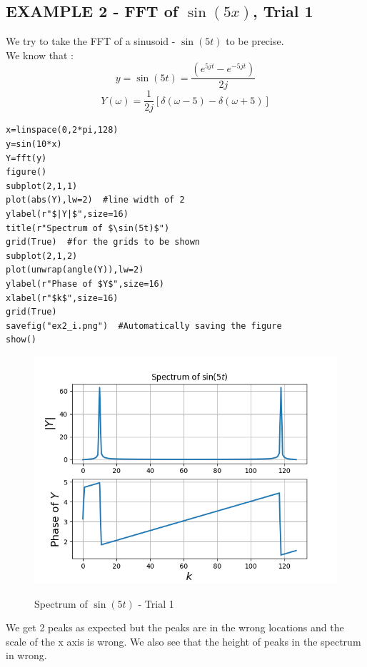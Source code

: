 \documentclass[11pt, a4paper]{article}
\begin{document}
\subsection{EXAMPLE 2 - FFT of $\sin(5x)$, Trial 1}
{
We try to take the FFT of a sinusoid - $\sin(5t)$ to be precise.
\\We know that :
\[y = \sin(5t) = \frac{(e^{5jt}-e^{-5jt})}{2j}\]
\[Y(\omega) = \frac{1}{2j} [\delta(\omega-5) - \delta(\omega+5)]
\]
}
\begin{verbatim}
x=linspace(0,2*pi,128)
y=sin(10*x)
Y=fft(y)
figure()
subplot(2,1,1)
plot(abs(Y),lw=2)  #line width of 2
ylabel(r"$|Y|$",size=16)
title(r"Spectrum of $\sin(5t)$")
grid(True)  #for the grids to be shown
subplot(2,1,2)
plot(unwrap(angle(Y)),lw=2)
ylabel(r"Phase of $Y$",size=16)
xlabel(r"$k$",size=16)
grid(True)
savefig("ex2_i.png")  #Automatically saving the figure
show()
\end{verbatim}
\begin{figure}[H]
   	\centering
   	\includegraphics[scale=0.8]{ex2_i.png}
   	\label{fig:ex2_i}
   	\caption{Spectrum of $\sin(5t)$ - Trial 1}
\end{figure}
{
We get 2 peaks as expected but the peaks are in the wrong locations and the scale of the x axis is wrong. We also see that the height of peaks in the spectrum in wrong.
}
\end{document}
